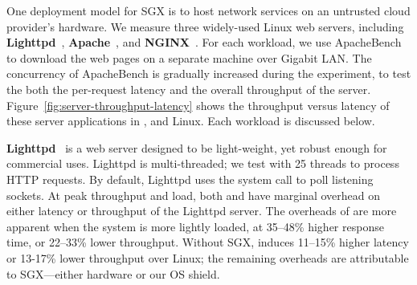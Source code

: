 One deployment model for SGX is to host network services
on an untrusted cloud provider's hardware.
We measure three widely-used Linux web servers, including {\bf Lighttpd}~\cite{lighttpd}, {\bf Apache}~\cite{apache}, and {\bf NGINX}~\cite{nginx}.
For each workload, we use ApacheBench~\cite{apachebench} to download the web pages on a separate machine
over Gigabit LAN. %
The concurrency of ApacheBench is gradually increased during the experiment, to test the both the per-request latency and the overall throughput of the server.
Figure~\ref{fig:server-throughput-latency} shows the throughput versus latency of these server applications
in \graphenesgx{}, \graphene{} and Linux. 
Each workload is discussed below.

{\bf Lighttpd}~\cite{lighttpd} is a web server designed to be light-weight, yet robust enough for commercial uses. 
Lighttpd is multi-threaded; we test with 25 threads to process HTTP requests. 
By default, Lighttpd uses the  system call to poll listening sockets.
At peak throughput and load,  both \graphene{} and \graphenesgx{} have marginal overhead on either latency or throughput of the Lighttpd server.
The overheads of \graphene{} are more apparent when the system
is more lightly loaded, at 
35--48\% higher response time, or 22--33\% lower throughput. 
Without SGX, \graphene{} induces 
11--15\% higher latency or 13-17\% lower throughput over Linux;
the remaining overheads are attributable to SGX---either hardware or our OS shield.


